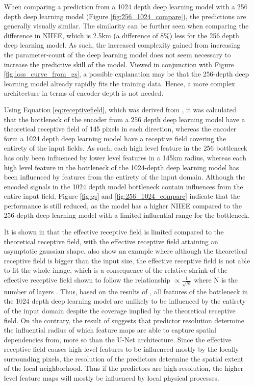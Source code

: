 \documentclass[../main/thesis]{subfiles}
\begin{document}
When comparing a prediction from a 1024 depth deep learning model with a 256 depth deep learning model (Figure \ref{fig:256_1024_compare}), the predictions are generally visually similar. The similarity can be further seen when comparing the difference in NIIEE, which is 2.5km (a difference of 8\%) less for the 256 depth deep learning model. As such, the increased complexity gained from increasing the parameter-count of the deep learning model does not seem necessary to increase the predictive skill of the model. Viewed in conjunction with Figure \ref{fig:loss_curve_from_gs}, a possible explanation may be that the 256-depth deep learning model already rapidly fits the training data. Hence, a more complex architecture in terms of encoder depth is not needed.

Using Equation \ref{eq:receptivefield}, which was derived from \citet{Araujo2019}, it was calculated that the bottleneck of the encoder from a 256 depth deep learning model have a theoretical receptive field of 145 pixels in each direction, whereas the encoder form a 1024 depth deep learning model have a receptive field covering the entirety of the input fields. As such, each high level feature in the 256 bottleneck has only been influenced by lower level features in a 145km radius, whereas each high level feature in the bottleneck of the 1024-depth deep learning model has been influenced by features from the entirety of the input domain. Although the encoded signals in the 1024 depth model bottleneck contain influences from the entire input field, Figure \ref{fig:gs} and \ref{fig:256_1024_compare} indicate that the performance is still reduced, as the model has a higher NIIEE compared to the 256-depth deep learning model with a limited influential range for the bottleneck. 

It is shown in \citet{Luo2017} that the effective receptive field is limited compared to the theoretical receptive field, with the effective receptive field attaining an asymptotic gaussian shape. \citet{Luo2017} also show an example where although the theoretical receptive field is bigger than the input size, the effective receptive field is not able to fit the whole image, which is a consequence of the relative shrink of the effective receptive field shown to follow the relationship $\propto \frac{1}{\sqrt{N}}$ where N is the number of layers \citep{Luo2017}. Thus, based on the results of \citet{Luo2017}, all features of the bottleneck in the 1024 depth deep learning model are unlikely to be influenced by the entirety of the input domain despite the coverage implied by the theoretical receptive field. On the contrary, the result of \citet{Luo2017} suggests that predictor resolution determine the influential radius of which feature maps are able to capture spatial dependencies from, more so than the U-Net architecture. Since the effective receptive field causes high level features to be influenced mostly by the locally surrounding pixels, the resolution of the predictors determine the spatial extent of the local neighborhood. Thus if the predictors are high-resolution, the higher level feature maps will mostly be influenced by local physical processes.
\end{document}
